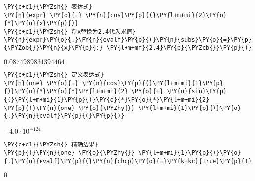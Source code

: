     

    \begin{tcolorbox}[breakable, size=fbox, boxrule=1pt, pad at break*=1mm,colback=cellbackground, colframe=cellborder]
\begin{Verbatim}[commandchars=\\\{\}]
\PY{c+c1}{\PYZsh{} 表达式}
\PY{n}{expr} \PY{o}{=} \PY{n}{cos}\PY{p}{(}\PY{l+m+mi}{2}\PY{o}{*}\PY{n}{x}\PY{p}{)}
\PY{c+c1}{\PYZsh{} 将x替换为2.4代入求值}
\PY{n}{expr}\PY{o}{.}\PY{n}{evalf}\PY{p}{(}\PY{n}{subs}\PY{o}{=}\PY{p}{\PYZob{}}\PY{n}{x}\PY{p}{:} \PY{l+m+mf}{2.4}\PY{p}{\PYZcb{}}\PY{p}{)}
\end{Verbatim}
\end{tcolorbox}
 
            
    
    $\displaystyle 0.0874989834394464$

    

    \begin{tcolorbox}[breakable, size=fbox, boxrule=1pt, pad at break*=1mm,colback=cellbackground, colframe=cellborder]
\begin{Verbatim}[commandchars=\\\{\}]
\PY{c+c1}{\PYZsh{} 定义表达式}
\PY{n}{one} \PY{o}{=} \PY{n}{cos}\PY{p}{(}\PY{l+m+mi}{1}\PY{p}{)}\PY{o}{*}\PY{o}{*}\PY{l+m+mi}{2} \PY{o}{+} \PY{n}{sin}\PY{p}{(}\PY{l+m+mi}{1}\PY{p}{)}\PY{o}{*}\PY{o}{*}\PY{l+m+mi}{2}
\PY{p}{(}\PY{n}{one} \PY{o}{\PYZhy{}} \PY{l+m+mi}{1}\PY{p}{)}\PY{o}{.}\PY{n}{evalf}\PY{p}{(}\PY{p}{)}
\end{Verbatim}
\end{tcolorbox}
 
            
    
    $\displaystyle -4.0 \cdot 10^{-124}$

    

    \begin{tcolorbox}[breakable, size=fbox, boxrule=1pt, pad at break*=1mm,colback=cellbackground, colframe=cellborder]
\begin{Verbatim}[commandchars=\\\{\}]
\PY{c+c1}{\PYZsh{} 精确结果}
\PY{p}{(}\PY{n}{one} \PY{o}{\PYZhy{}} \PY{l+m+mi}{1}\PY{p}{)}\PY{o}{.}\PY{n}{evalf}\PY{p}{(}\PY{n}{chop}\PY{o}{=}\PY{k+kc}{True}\PY{p}{)}
\end{Verbatim}
\end{tcolorbox}
 
            
    
    $\displaystyle 0$
